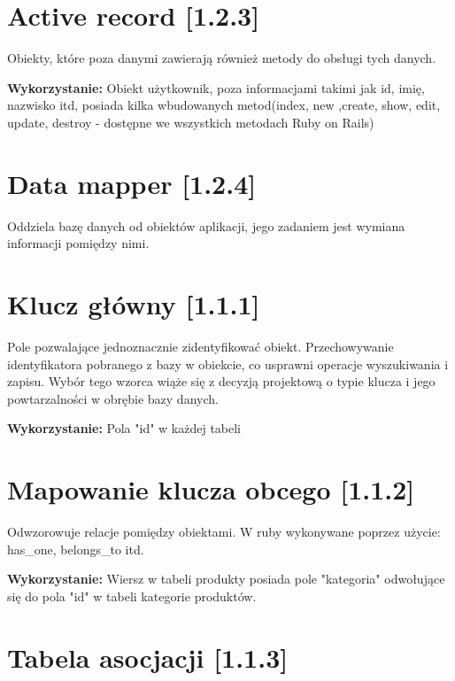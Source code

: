 \documentclass[pdflatex,11pt]{aghdpl}
\begin{document}

\section{Active record [1.2.3]}

Obiekty, które poza danymi zawierają również metody do obsługi tych danych.

\textbf{Wykorzystanie:} Obiekt użytkownik, poza informacjami takimi jak id, imię, nazwisko itd, posiada kilka wbudowanych metod(index, new ,create, show, edit, update, destroy - dostępne we wszystkich metodach Ruby on Rails)


\section{Data mapper [1.2.4]}

Oddziela bazę danych od obiektów aplikacji, jego zadaniem jest wymiana informacji pomiędzy nimi.



\section{Klucz główny [1.1.1]}

Pole pozwalające jednoznacznie zidentyfikować obiekt. Przechowywanie identyfikatora pobranego z bazy w obiekcie, co usprawni operacje wyszukiwania i zapisu. Wybór tego wzorca wiąże się z decyzją projektową o typie klucza i jego powtarzalności w obrębie bazy danych.

\textbf{Wykorzystanie:} Pola "id" w każdej tabeli


\section{Mapowanie klucza obcego [1.1.2]}

Odwzorowuje relacje pomiędzy obiektami. W ruby wykonywane poprzez użycie: has\_one, belongs\_to itd.

\textbf{Wykorzystanie:} Wiersz w tabeli produkty posiada pole "kategoria" odwołujące się do pola "id" w tabeli kategorie produktów.


\section{Tabela asocjacji [1.1.3]}
\end{document}

